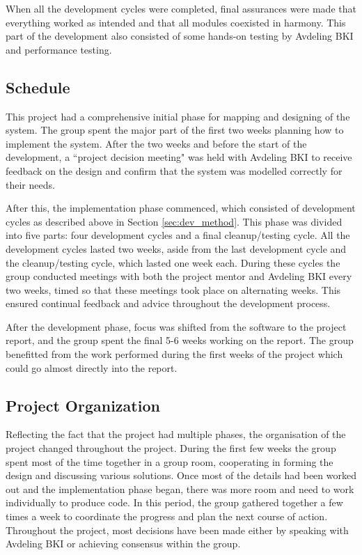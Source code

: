When all the development cycles were completed, final assurances were made that
everything worked as intended and that all modules coexisted in harmony. This
part of the development also consisted of some hands-on testing by Avdeling BKI
and performance testing.

\subsection{Schedule}
This project had a comprehensive initial phase for mapping
and designing of the system. The group spent the major part of the first two
weeks planning how to implement the system. After the two weeks and before
the start of the development, a ``project decision meeting" was held with
Avdeling BKI to receive feedback on the design and confirm that the system was
modelled correctly for their needs.

After this, the implementation phase commenced, which consisted of development
cycles as described above in Section \ref{sec:dev_method}. This phase was
divided into five parts: four development cycles and a final cleanup/testing
cycle. All the development cycles lasted two weeks, aside from the last development cycle and the cleanup/testing
cycle, which lasted one week each. During these cycles the group conducted
meetings with both the project mentor and Avdeling BKI every two weeks, timed so
that these meetings took place on alternating weeks. This ensured continual
feedback and advice throughout the development process.

After the development phase, focus was shifted from the software to the project
report, and the group spent the final 5-6 weeks working on the report. The group
benefitted from the work performed during the first weeks of the project which
could go almost directly into the report.

\subsection{Project Organization}
Reflecting the fact that the project had multiple phases, the organisation of
the project changed throughout the project. During the first few weeks the group
spent most of the time together in a group room, cooperating in forming the
design and discussing various solutions. Once most of the details had been
worked out and the implementation phase began, there was more room and need to work individually to produce code. In this period, the group gathered
together a few times a week to coordinate the progress and plan the next course
of action. Throughout the project, most decisions have been made either by
speaking with Avdeling BKI or achieving consensus within the group. 
